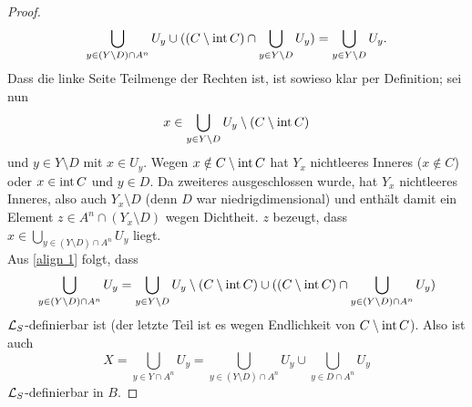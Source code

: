 \begin{proof}
	\begin{align}\label{align 1}
	\bigcup\limits_{y\in (Y\setminus D)\cap A^n}U_y\cup((C\setminus\operatorname{int} C)\cap\bigcup\limits_{y\in Y\setminus D}U_y)=\bigcup\limits_{y\in Y\setminus D}U_y.
	\end{align}
	Dass die linke Seite Teilmenge der Rechten ist, ist sowieso klar per Definition; sei nun $$x\in\bigcup\limits_{y\in Y\setminus D}U_y\setminus (C\setminus\operatorname{int} C)$$ und $y\in Y\setminus D$ mit $x\in U_y$. Wegen $x\notin C\setminus\operatorname{int} C$ hat $Y_x$ nichtleeres Inneres ($x\notin C$) oder $x\in\operatorname{int} C$ und $y\in D$. Da zweiteres ausgeschlossen wurde, hat $Y_x$ nichtleeres Inneres, also auch $Y_x\setminus D$ (denn $D$ war niedrigdimensional) und enthält damit ein Element $z\in A^n\cap(Y_x\setminus D)$ wegen Dichtheit. $z$ bezeugt, dass $x\in\bigcup\limits_{y\in (Y\setminus D)\cap A^n}U_y$ liegt.\\
	Aus \ref{align 1} folgt, dass $$\bigcup\limits_{y\in (Y\setminus D)\cap A^n}U_y=\bigcup\limits_{y\in Y\setminus D}U_y\setminus(C\setminus\operatorname{int} C)\cup((C\setminus\operatorname{int} C)\cap\bigcup\limits_{y\in (Y\setminus D)\cap A^n}U_y)$$ $\mathcal{L}_S$-definierbar ist (der letzte Teil ist es wegen Endlichkeit von $C\setminus\operatorname{int} C$). Also ist auch $$X=\bigcup\limits_{y\in Y\cap A^n}U_y=\bigcup\limits_{y\in (Y\setminus D)\cap A^n}U_y\cup\bigcup\limits_{y\in D\cap A^n}U_y$$ $\mathcal{L}_S$-definierbar in $B$.
\end{proof}

